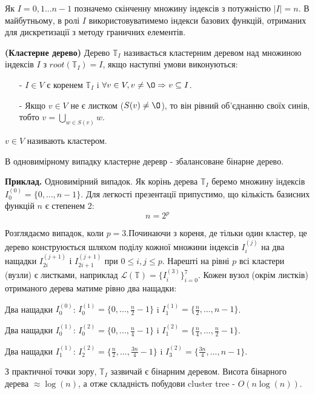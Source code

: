 \documentclass[12pt]{report}
\begin{document}
	\hspace{0.8cm}Як $I={0,1...n-1}$ позначемо скінченну множину індексів з потужністю $|I|=n$. В майбутньому, в ролі $I$ використовуватимемо індекси базових функцій, отриманих для дискретизації з методу граничних елементів.
	\begin{Def}
	 {\bf (Кластерне дерево)} Дерево $\mathbb{T}_{I}$ називається кластерним деревом над множиною індексів $I$ з $root(\mathbb{T}_{I})=I$, якщо наступні умови виконуються:
	\begin{enumerate}
		\item[-] $I \in V$ є коренем $\mathbb{T}_{I}$ i $\forall v \in V,v\not=\O \Rightarrow v\subseteq I$.
		\item[-] Якщо $v\in V$ не є листком ($S(v)\not=\O$), то він рівний об'єднанню своїх синів, тобто $v=\bigcup_{w\in S(v)}w$.
	\end{enumerate}
	\end{Def}
	\par $v\in V$ називають кластером.
	\par В одновимірному випадку кластерне деревр - збалансоване бінарне дерево.
	\par {\bf Приклад.} Одновимірний випадок.\newline
	Як корінь дерева $\mathbb{T}_{I}$ беремо множину індексів $I_0^{(0)}=\{0,...,n-1\}$. Для легкості презентації припустимо, що кількість базисних функцій $n$ є степенем 2:
	$$n=2^p$$ 
	\par Розглядаємо випадок, коли $p=3$.Починаючи з кореня, де тільки один кластер, це дерево конструюється шляхом поділу кожної множини індексів $I_i^{(j)}$ на два нащадки $I_{2i}^{(j+1)}$ і $I_{2i+1}^{(j+1)}$ при $0\le i,j\le p$. Нарешті на рівні $p$ всі кластери (вузли) є листками, наприклад $\mathcal{L}(\mathbb{T})=\{I_i^{(3)}\}_{i=0}^7$. Кожен вузол (окрім листків) отриманого дерева матиме рівно два нащадки:
	\par Два нащадки $I_0^{(0)}$: $I_0^{(1)}=\{0,...,\frac{n}{2}-1\}$  i  $I_1^{(1)}=\{\frac{n}{2},...,n-1\}$. 
	\par Два нащадки $I_0^{(1)}$: $I_0^{(2)}=\{0,...,\frac{n}{4}-1\}$  i  $I_1^{(2)}=\{\frac{n}{4},...,\frac{n}{2}-1\}$.
	\par Два нащадки $I_1^{(1)}$: $I_2^{(2)}=\{\frac{n}{2},...,\frac{3n}{4}-1\}$  i  $I_3^{(2)}=\{\frac{3n}{4},...,n-1\}$.  
	\newline
	\par З практичної точки зору, $\mathbb{T}_{I}$ зазвичай є бінарним деревом. Висота бінарного дерева $\approx\log(n)$, а отже складність побудови cluster tree - $O(n\log(n))$.
\end{document}
